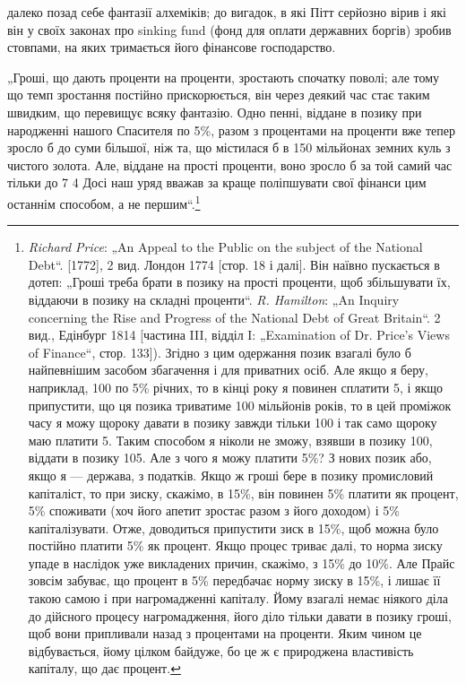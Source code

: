 \parcont{}  %
далеко позад себе фантазії алхеміків; до вигадок, в які Пітт
серйозно вірив і які він у своїх законах про sinking fund (фонд
для оплати державних боргів) зробив стовпами, на яких тримається
його фінансове господарство.

„Гроші, що дають проценти на проценти, зростають спочатку
поволі; але тому що темп зростання постійно прискорюється, він
через деякий час стає таким швидким, що перевищує всяку фантазію.
Одно пенні, віддане в позику при народженні нашого
Спасителя по 5\%, разом з процентами на проценти вже тепер
зросло б до суми більшої, ніж та, що містилася б в 150 мільйонах
земних куль з чистого золота. Але, віддане на прості проценти,
воно зросло б за той самий час тільки до 7 4
Досі наш уряд вважав за краще поліпшувати свої фінанси цим
останнім способом, а не першим“.\footnote{
\emph{Richard Price}: „An Appeal to the Public on the subject of the National Debt“.
[1772], 2 вид. Лондон 1774 [стор. 18 і далі]. Він наївно пускається в дотеп: „Гроші
треба брати в позику на прості проценти, щоб збільшувати їх, віддаючи в позику
на складні проценти“. \emph{R. Hamilton}: „An Inquiry concerning the Rise and
Progress of the National Debt of Great Britain“. 2 вид., Едінбург 1814 [частина III,
відділ I: „Examination of Dr. Price’s Views of Finance“, стор. 133]). Згідно з цим
одержання позик взагалі було б найпевнішим засобом збагачення і для приватних
осіб. Але якщо я беру, наприклад, 100 по 5\% річних,
то в кінці року я повинен сплатити 5, і якщо припустити, що
ця позика триватиме 100 мільйонів років, то в цей проміжок часу я можу щороку
давати в позику завжди тільки 100 і так само щороку маю платити
5. Таким способом я ніколи не зможу, взявши в позику
100, віддати в позику 105. Але з чого я можу
платити 5\%? З нових позик або, якщо я — держава, з податків. Якщо ж гроші
бере в позику промисловий капіталіст, то при зиску, скажімо, в 15\%, він повинен
5\% платити як процент, 5\% споживати (хоч його апетит зростає разом
з його доходом) і 5\% капіталізувати. Отже, доводиться припустити зиск в 15\%,
щоб можна було постійно платити 5\% як процент. Якщо процес триває далі, то
норма зиску упаде в наслідок уже викладених причин, скажімо, з 15\% до 10\%.
Але Прайс зовсім забуває, що процент в 5\% передбачає норму зиску в 15\%,
і лишає її такою самою і при нагромадженні капіталу. Йому взагалі немає ніякого
діла до дійсного процесу нагромадження, його діло тільки давати в позику
гроші, щоб вони припливали назад з процентами на проценти. Яким чином
це відбувається, йому цілком байдуже, бо це ж є природжена властивість
капіталу, що дає процент.
}

